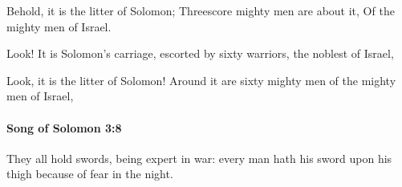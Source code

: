 			\begin{versebox}
					\item[BHS] 
					\item[LXX] 
					\item[ASV] Behold, it is the litter of Solomon; Threescore mighty men are about it, Of the mighty men of Israel.
					\item[NIV] Look! It is Solomon’s carriage, escorted by sixty warriors, the noblest of Israel,
					\item[NRSV] Look, it is the litter of Solomon! Around it are sixty mighty men of the mighty men of Israel,
			\end{versebox}

		\paragraph{Song of Solomon 3:8} %
			\label{SONGOFSOLOMON-3-8}

			They all hold swords, being expert in war: every man hath his sword upon his thigh because of fear in the night.

